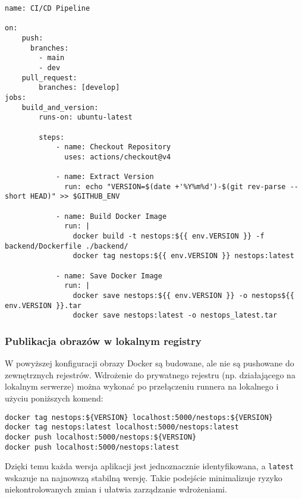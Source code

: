 \begin{verbatim}
name: CI/CD Pipeline

on:
    push:
      branches:
        - main
        - dev
    pull_request:
        branches: [develop]
jobs:
    build_and_version:
        runs-on: ubuntu-latest

        steps:
            - name: Checkout Repository
              uses: actions/checkout@v4

            - name: Extract Version
              run: echo "VERSION=$(date +'%Y%m%d')-$(git rev-parse --short HEAD)" >> $GITHUB_ENV

            - name: Build Docker Image
              run: |
                docker build -t nestops:${{ env.VERSION }} -f backend/Dockerfile ./backend/
                docker tag nestops:${{ env.VERSION }} nestops:latest

            - name: Save Docker Image
              run: |
                docker save nestops:${{ env.VERSION }} -o nestops${{ env.VERSION }}.tar
                docker save nestops:latest -o nestops_latest.tar
\end{verbatim}

\subsubsection{Publikacja obrazów w lokalnym registry}

W powyższej konfiguracji obrazy Docker są budowane, ale nie są pushowane do zewnętrznych rejestrów. Wdrożenie do prywatnego rejestru (np. działającego na lokalnym serwerze) można wykonać po przełączeniu runnera na lokalnego i użyciu poniższych komend:

\begin{verbatim}
docker tag nestops:${VERSION} localhost:5000/nestops:${VERSION}
docker tag nestops:latest localhost:5000/nestops:latest
docker push localhost:5000/nestops:${VERSION}
docker push localhost:5000/nestops:latest
\end{verbatim}

Dzięki temu każda wersja aplikacji jest jednoznacznie identyfikowana, a \texttt{latest} wskazuje na najnowszą stabilną wersję. Takie podejście minimalizuje ryzyko niekontrolowanych zmian i ułatwia zarządzanie wdrożeniami.